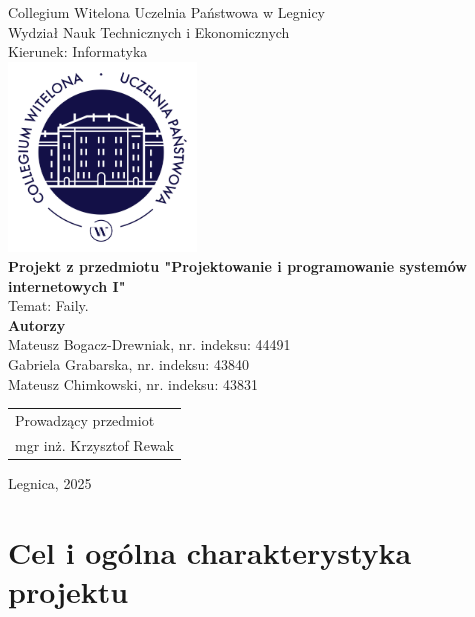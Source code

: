 \documentclass[12pt,a4paper]{article}
\begin{document}
\begin{titlepage}
\begin{center}
\large
    {\noindent Collegium Witelona Uczelnia Państwowa w Legnicy}\\
    {\noindent Wydział Nauk Technicznych i Ekonomicznych}\\
    {\noindent Kierunek: Informatyka}\\[2cm]
    \includegraphics[width=5cm]{godlo.jpg}\\[2cm]
    {\large\textbf{Projekt z przedmiotu "Projektowanie i programowanie systemów internetowych I"}}\\[0.3cm]
    {\noindent Temat: Faily.}\\[3cm]
    {\large\textbf{Autorzy}}\\
    Mateusz Bogacz-Drewniak, nr. indeksu: 44491\\
    Gabriela Grabarska, nr. indeksu: 43840\\
    Mateusz Chimkowski, nr. indeksu: 43831\\[2.5cm]			
\end{center}
		
\begin{flushright}
    \begin{tabular}{l}
        Prowadzący przedmiot\\
        mgr inż. Krzysztof Rewak
    \end{tabular}
\end{flushright}
		
\vfill
\begin{center}
    {\noindent Legnica, 2025}
    \end{center}
\end{titlepage}

\tableofcontents
\newpage

\section{Cel i ogólna charakterystyka projektu}
\end{document}
